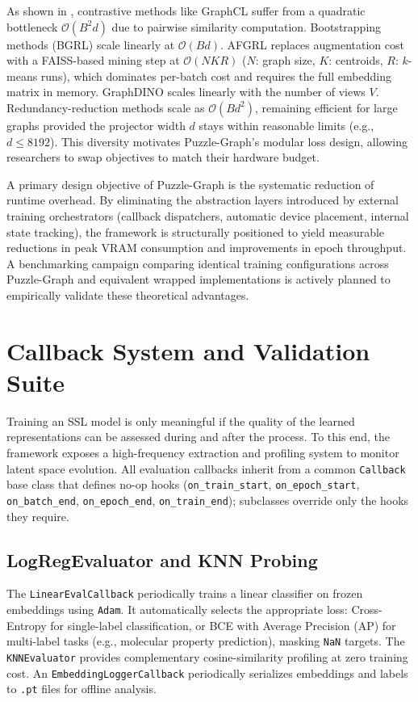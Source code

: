 \documentclass[conference]{IEEEtran}
\begin{document}
As shown in , contrastive methods like GraphCL suffer from a quadratic bottleneck $\mathcal{O}(B^2 d)$ due to pairwise similarity computation. Bootstrapping methods (BGRL) scale linearly at $\mathcal{O}(B d)$. AFGRL replaces augmentation cost with a FAISS-based mining step at $\mathcal{O}(NKR)$ ($N$: graph size, $K$: centroids, $R$: $k$-means runs), which dominates per-batch cost and requires the full embedding matrix in memory. GraphDINO scales linearly with the number of views $V$. Redundancy-reduction methods scale as $\mathcal{O}(B d^2)$, remaining efficient for large graphs provided the projector width $d$ stays within reasonable limits (e.g., $d \le 8192$). This diversity motivates Puzzle-Graph's modular loss design, allowing researchers to swap objectives to match their hardware budget.

A primary design objective of Puzzle-Graph is the systematic reduction of runtime overhead. By eliminating the abstraction layers introduced by external training orchestrators (callback dispatchers, automatic device placement, internal state tracking), the framework is structurally positioned to yield measurable reductions in peak VRAM consumption and improvements in epoch throughput. A benchmarking campaign comparing identical training configurations across Puzzle-Graph and equivalent wrapped implementations is actively planned to empirically validate these theoretical advantages.

\section{Callback System and Validation Suite}
\label{sec:callbacks}
Training an SSL model is only meaningful if the quality of the learned representations can be assessed during and after the process. To this end, the framework exposes a high-frequency extraction and profiling system to monitor latent space evolution. All evaluation callbacks inherit from a common \texttt{Callback} base class that defines no-op hooks (\texttt{on\_train\_start}, \texttt{on\_epoch\_start}, \texttt{on\_batch\_end}, \texttt{on\_epoch\_end}, \texttt{on\_train\_end}); subclasses override only the hooks they require.

\subsection{LogRegEvaluator and KNN Probing}
The \texttt{LinearEvalCallback} periodically trains a linear classifier on frozen embeddings using \texttt{Adam}. It automatically selects the appropriate loss: Cross-Entropy for single-label classification, or BCE with Average Precision (AP) for multi-label tasks (e.g., molecular property prediction), masking \texttt{NaN} targets. The \texttt{KNNEvaluator} provides complementary cosine-similarity profiling at zero training cost. An \texttt{EmbeddingLoggerCallback} periodically serializes embeddings and labels to \texttt{.pt} files for offline analysis.
\end{document}
